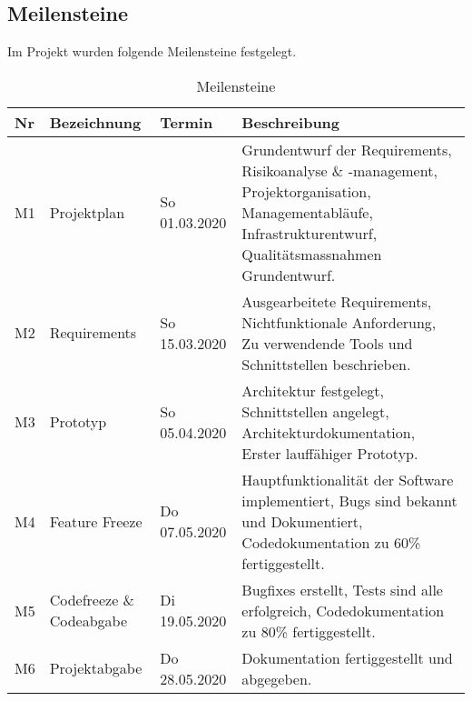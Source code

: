 \documentclass[
	ngerman,
	toc=listof, %
	toc=bibliography, %
	footnotes=multiple, %
	parskip=half, %
	numbers=noendperiod %
]{scrartcl}
\begin{document}
	\subsection{Meilensteine}
	Im Projekt wurden folgende Meilensteine festgelegt.
		\begin{table}[!h]	
			\begin{tabularx}{\linewidth}{lllX}
				\toprule
				Nr & Bezeichnung & Termin & Beschreibung \\
				\midrule
				M1 & Projektplan & So 01.03.2020 & Grundentwurf der Requirements, Risikoanalyse \& -management, Projektorganisation, Managementabläufe, Infrastrukturentwurf, Qualitätsmassnahmen Grundentwurf.\\
				\midrule
				M2 & Requirements & So 15.03.2020 & Ausgearbeitete Requirements, Nichtfunktionale Anforderung, Zu verwendende Tools und Schnittstellen beschrieben.\\
				\midrule 
				M3 & Prototyp & So 05.04.2020 & Architektur festgelegt, Schnittstellen angelegt, Architekturdokumentation, Erster lauffähiger Prototyp.\\
				\midrule
				M4 & Feature Freeze & Do 07.05.2020 & Hauptfunktionalität der Software implementiert, Bugs sind bekannt und Dokumentiert, Codedokumentation zu 60\% fertiggestellt.\\
				\midrule
				M5 & Codefreeze \& Codeabgabe & Di 19.05.2020 & Bugfixes erstellt, Tests sind alle erfolgreich, Codedokumentation zu 80\% fertiggestellt.\\
				\midrule
				M6 & Projektabgabe & Do 28.05.2020 & Dokumentation fertiggestellt und abgegeben.\\
				\bottomrule
			\end{tabularx}
		\caption{Meilensteine}
		\end{table}	
\end{document}
